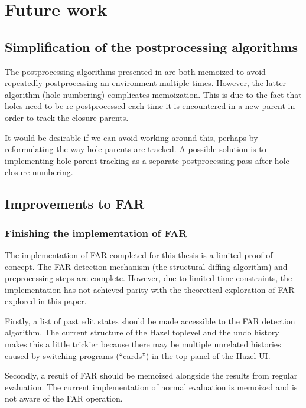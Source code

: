 \chapter{Future work}
\label{sec:future_work}

\section{Simplification of the postprocessing algorithms}
\label{sec:postprocessing-simplification}

The postprocessing algorithms presented in  are both memoized to avoid repeatedly postprocessing an environment multiple times. However, the latter algorithm (hole numbering) complicates memoization. This is due to the fact that holes need to be re-postprocessed each time it is encountered in a new parent in order to track the closure parents.

It would be desirable if we can avoid working around this, perhaps by reformulating the way hole parents are tracked. A possible solution is to implementing hole parent tracking as a separate postprocessing pass after hole closure numbering.

\section{Improvements to FAR}
\label{sec:far-improvements}

\subsection{Finishing the implementation of FAR}
\label{sec:finishing-far}

The implementation of FAR completed for this thesis is a limited proof-of-concept. The FAR detection mechanism (the structural diffing algorithm) and preprocessing steps are complete. However, due to limited time constraints, the implementation has not achieved parity with the theoretical exploration of FAR explored in this paper.

Firstly, a list of past edit states should be made accessible to the FAR detection algorithm. The current structure of the Hazel toplevel and the undo history makes this a little trickier because there may be multiple unrelated histories caused by switching programs (``cards'') in the top panel of the Hazel UI.

Secondly, a result of FAR should be memoized alongside the results from regular evaluation. The current implementation of normal evaluation is memoized and is not aware of the FAR operation.

